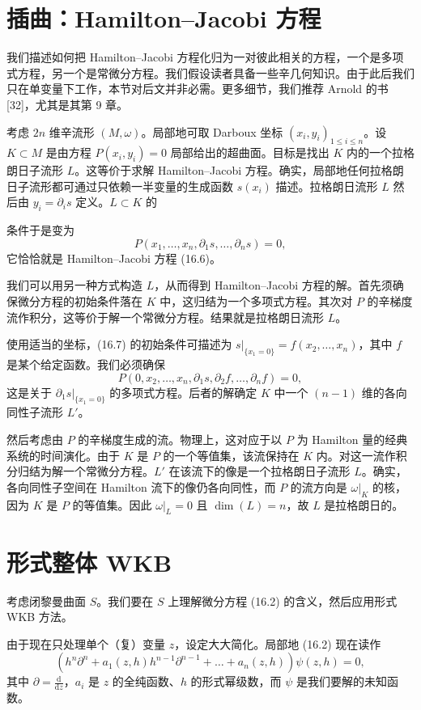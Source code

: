 \section{插曲：Hamilton–Jacobi 方程}

我们描述如何把 Hamilton–Jacobi 方程化归为一对彼此相关的方程，一个是多项式方程，另一个是常微分方程。我们假设读者具备一些辛几何知识。由于此后我们只在单变量下工作，本节对后文并非必需。更多细节，我们推荐 Arnold 的书 [32]，尤其是其第 9 章。

考虑 $2n$ 维辛流形 $(M,\omega)$。局部地可取 Darboux 坐标 $(x_i,y_i)_{1\le i\le n}$。设 $K\subset M$ 是由方程 $P(x_i,y_i)=0$ 局部给出的超曲面。目标是找出 $K$ 内的一个拉格朗日子流形 $L$。这等价于求解 Hamilton–Jacobi 方程。确实，局部地任何拉格朗日子流形都可通过只依赖一半变量的生成函数 $s(x_i)$ 描述。拉格朗日流形 $L$ 然后由 $y_i=\partial_is$ 定义。$L\subset K$ 的

条件于是变为
\begin{equation}
P(x_1,\dots,x_n,\partial_1s,\dots,\partial_ns)=0,
\tag{16.7}
\end{equation}
它恰恰就是 Hamilton–Jacobi 方程 (16.6)。

我们可以用另一种方式构造 $L$，从而得到 Hamilton–Jacobi 方程的解。首先须确保微分方程的初始条件落在 $K$ 中，这归结为一个多项式方程。其次对 $P$ 的辛梯度流作积分，这等价于解一个常微分方程。结果就是拉格朗日流形 $L$。

使用适当的坐标，(16.7) 的初始条件可描述为 $s|_{\{x_1=0\}}=f(x_2,\dots,x_n)$，其中 $f$ 是某个给定函数。我们必须确保
\[
P(0,x_2,\dots,x_n,\partial_1s,\partial_2f,\dots,\partial_nf)=0,
\]
这是关于 $\partial_1s|_{\{x_1=0\}}$ 的多项式方程。后者的解确定 $K$ 中一个 $(n-1)$ 维的各向同性子流形 $L'$。

然后考虑由 $P$ 的辛梯度生成的流。物理上，这对应于以 $P$ 为 Hamilton 量的经典系统的时间演化。由于 $K$ 是 $P$ 的一个等值集，该流保持在 $K$ 内。对这一流作积分归结为解一个常微分方程。$L'$ 在该流下的像是一个拉格朗日子流形 $L$。确实，各向同性子空间在 Hamilton 流下的像仍各向同性，而 $P$ 的流方向是 $\omega|_K$ 的核，因为 $K$ 是 $P$ 的等值集。因此 $\omega|_L=0$ 且 $\dim(L)=n$，故 $L$ 是拉格朗日的。

\section{形式整体 WKB}

考虑闭黎曼曲面 $S$。我们要在 $S$ 上理解微分方程 (16.2) 的含义，然后应用形式 WKB 方法。

由于现在只处理单个（复）变量 $z$，设定大大简化。局部地 (16.2) 现在读作
\begin{equation}
(h^n\partial^n+a_1(z,h)h^{n-1}\partial^{n-1}+\dots+a_n(z,h))\psi(z,h)=0,
\tag{16.8}
\end{equation}
其中 $\partial=\frac{\mathrm{d}}{\mathrm{d}z}$，$a_i$ 是 $z$ 的全纯函数、$h$ 的形式幂级数，而 $\psi$ 是我们要解的未知函数。

